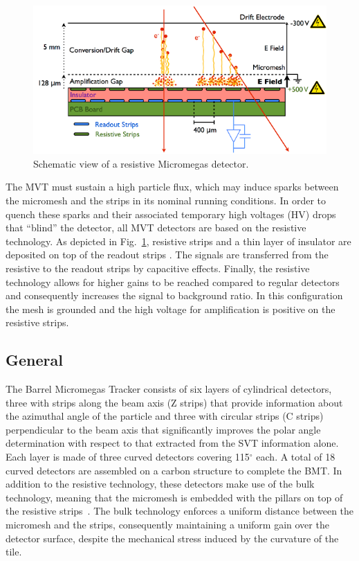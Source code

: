 \begin{figure}[htb]
\includegraphics[width=1.0\columnwidth,keepaspectratio]{images/mm_principle}
\caption{Schematic view of a resistive Micromegas detector.}
\label{fig:mm-principle}
\end{figure}

The MVT must sustain a high particle flux, which may induce sparks between the micromesh and the strips in its nominal
running conditions. In order to quench these sparks and their associated temporary high voltages (HV) drops that ``blind''
the detector, all MVT detectors are based on the resistive technology. As depicted in Fig.~\ref{fig:mm-principle}, resistive
strips and a thin layer of insulator are deposited on top of the readout strips \cite{ALEXOPOULOS2011110}. The signals are
transferred from the resistive to the readout strips by capacitive effects. Finally, the resistive technology allows for higher
gains to be reached compared to regular detectors and consequently increases the signal to background ratio. In this
configuration the mesh is grounded and the high voltage for amplification is positive on the resistive strips. 

\subsection{General}

The Barrel Micromegas Tracker consists of six layers of cylindrical detectors, three with strips along the beam axis (Z strips)
that provide information about the azimuthal angle of the particle and three with circular strips (C strips) perpendicular to the
beam axis that significantly improves the polar angle determination with respect to that extracted from the SVT information
alone. Each layer is made of three curved detectors covering 115$^\circ$ each. A total of 18 curved detectors are assembled on
a carbon structure to complete the BMT. In addition to the resistive technology, these detectors make use of the bulk technology,
meaning that the micromesh is embedded with the pillars on top of the resistive strips~\cite{GIOMATARIS2006405}. The bulk
technology enforces a uniform distance between the micromesh and the strips, consequently maintaining a uniform gain over the
detector surface, despite the mechanical stress induced by the curvature of the tile.

